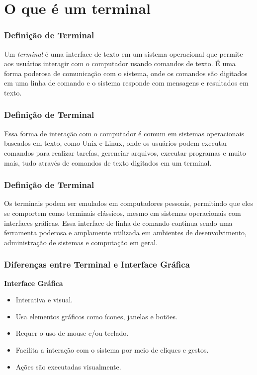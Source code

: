 \documentclass{beamer}
\begin{document}
\section*{O que é um terminal}  
\begin{frame}\justifying
      \frametitle{Definição de Terminal}
      
      Um \textit{terminal} é uma interface de texto em um sistema operacional que permite aos usuários interagir com o computador usando comandos de texto. É uma forma poderosa de comunicação com o sistema, onde os comandos são digitados em uma linha de comando e o sistema responde com mensagens e resultados em texto.
\end{frame}
      

      \begin{frame}\justifying
            \frametitle{Definição de Terminal}
      Essa forma de interação com o computador é comum em sistemas operacionais baseados em texto, como Unix e Linux, onde os usuários podem executar comandos para realizar tarefas, gerenciar arquivos, executar programas e muito mais, tudo através de comandos de texto digitados em um terminal.
      
      \end{frame}

      \begin{frame}\justifying
            \frametitle{Definição de Terminal}
      Os terminais podem ser emulados em computadores pessoais, permitindo que eles se comportem como terminais clássicos, mesmo em sistemas operacionais com interfaces gráficas. Essa interface de linha de comando continua sendo uma ferramenta poderosa e amplamente utilizada em ambientes de desenvolvimento, administração de sistemas e computação em geral.
      
      \end{frame}
      
      \begin{frame}\justifying
            \frametitle{Diferenças entre Terminal e Interface Gráfica}
            
            \textbf{Interface Gráfica}
            \begin{itemize}
                \item Interativa e visual.
                \item Usa elementos gráficos como ícones, janelas e botões.
                \item Requer o uso de mouse e/ou teclado.
                \item Facilita a interação com o sistema por meio de cliques e gestos.
                \item Ações são executadas visualmente.
            \end{itemize}
      \end{frame}
            
\end{document}
